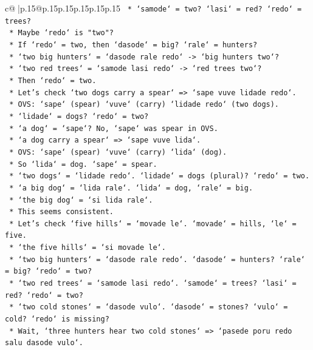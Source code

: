 \documentclass{article}
\begin{document}
{\begin{supertabular}{c@{$\;$}|p{.15\linewidth}@{}p{.15\linewidth}p{.15\linewidth}p{.15\linewidth}p{.15\linewidth}p{.15\linewidth}}
{{{\texttt{        *   `samode` = two? `lasi` = red? `redo` = trees?} \\
\texttt{        *   Maybe `redo` is "two"?} \\
\texttt{        *   If `redo` = two, then `dasode` = big? `rale` = hunters?} \\
\texttt{        *   `two big hunters` = `dasode rale redo` {-}> `big hunters two`?} \\
\texttt{        *   `two red trees` = `samode lasi redo` {-}> `red trees two`?} \\
\texttt{        *   Then `redo` = two.} \\
\texttt{        *   Let's check `two dogs carry a spear` => `sape vuve lidade redo`.} \\
\texttt{        *   OVS: `sape` (spear) `vuve` (carry) `lidade redo` (two dogs).} \\
\texttt{        *   `lidade` = dogs? `redo` = two?} \\
\texttt{        *   `a dog` = `sape`? No, `sape` was spear in OVS.} \\
\texttt{        *   `a dog carry a spear` => `sape vuve lida`.} \\
\texttt{        *   OVS: `sape` (spear) `vuve` (carry) `lida` (dog).} \\
\texttt{        *   So `lida` = dog. `sape` = spear.} \\
\texttt{        *   `two dogs` = `lidade redo`. `lidade` = dogs (plural)? `redo` = two.} \\
\texttt{        *   `a big dog` = `lida rale`. `lida` = dog, `rale` = big.} \\
\texttt{        *   `the big dog` = `si lida rale`.} \\
\texttt{        *   This seems consistent.} \\
\texttt{        *   Let's check `five hills` = `movade le`. `movade` = hills, `le` = five.} \\
\texttt{        *   `the five hills` = `si movade le`.} \\
\texttt{        *   `two big hunters` = `dasode rale redo`. `dasode` = hunters? `rale` = big? `redo` = two?} \\
\texttt{        *   `two red trees` = `samode lasi redo`. `samode` = trees? `lasi` = red? `redo` = two?} \\
\texttt{        *   `two cold stones` = `dasode vulo`. `dasode` = stones? `vulo` = cold? `redo` is missing?} \\
\texttt{        *   Wait, `three hunters hear two cold stones` => `pasede poru redo salu dasode vulo`.} \\
}}}
\end{supertabular}}
\end{document}
